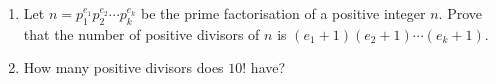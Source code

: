 \begin{enumerate}
\item[(a)] Let \(n=p_1^{e_1}p_2^{e_2}\cdots p_k^{e_k}\) be the prime factorisation of a positive integer \(n\). Prove that the number of positive divisors of \(n\) is \((e_1+1)(e_2+1)\cdots(e_k+1)\).
\item[(b)] How many positive divisors does \(10!\) have?
\end{enumerate}
